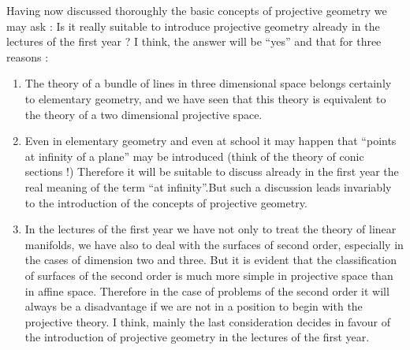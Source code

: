 Having now discussed thoroughly the basic concepts of projective
geometry we may ask : Is it really suitable to introduce projective
geometry already in the lectures of the first year ? I think, the
answer will be ``yes'' and that for three reasons :
\begin{enumerate}
\item The theory of a bundle of lines in three dimensional space
  belongs certainly to elementary geometry, and we have seen that this
  theory is equivalent to the theory of a two dimensional projective
  space.

\item Even in elementary geometry and even at school it may happen
  that ``points at infinity of a plane'' may be introduced (think of
  the theory of conic sections !) Therefore it will be suitable to
  discuss already in the first year the real meaning of the term ``at
  infinity''.\pageoriginale But such a discussion leads invariably to
  the introduction of the concepts of projective geometry.

\item In the lectures of the first year we have not only to treat the
  theory of linear manifolds, we have also to deal with the surfaces
  of second order, especially in the cases of dimension two and
  three. But it is evident that the classification of surfaces of the
  second order is much more simple in projective space than in affine
  space. Therefore in the case of problems of the second order it will
  always be a disadvantage if we are not in a position to begin with
  the projective theory. I think, mainly the last consideration
  decides in favour of the introduction of projective geometry in the
  lectures of the first year. 
\end{enumerate}


